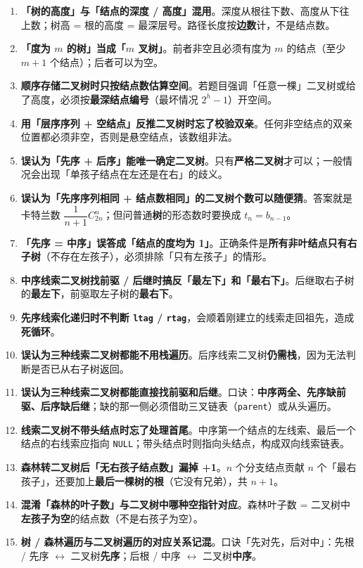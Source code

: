 \documentclass[11pt,openany,UTF8]{ctexbook}
\begin{document}
\begin{enumerate}
\item \textbf{「树的高度」与「结点的深度 / 高度」混用}。深度从根往下数、高度从下往上数；树高 = 根的高度 = 最深层号。路径长度按\textbf{边数}计，不是结点数。
\item \textbf{「度为 $m$ 的树」当成「$m$ 叉树」}。前者非空且必须有度为 $m$ 的结点（至少 $m+1$ 个结点）；后者可以为空。
\item \textbf{顺序存储二叉树时只按结点数估算空间}。若题目强调「任意一棵」二叉树或给了高度，必须按\textbf{最深结点编号}（最坏情况 $2^h-1$）开空间。
\item \textbf{用「层序序列 + 空结点」反推二叉树时忘了校验双亲}。任何非空结点的双亲位置都必须非空，否则是悬空结点，该数组非法。
\item \textbf{误认为「先序 + 后序」能唯一确定二叉树}。只有\textbf{严格二叉树}才可以；一般情况会出现「单孩子结点在左还是在右」的歧义。
\item \textbf{误认为「先序序列相同 + 结点数相同」的二叉树个数可以随便猜}。答案就是卡特兰数 $\dfrac{1}{n+1}C_{2n}^{n}$；但问普通\textbf{树}的形态数时要换成 $t_n=b_{n-1}$。
\item \textbf{「先序 = 中序」误答成「结点的度均为 1」}。正确条件是\textbf{所有非叶结点只有右子树}（不存在左孩子），必须排除「只有左孩子」的情形。
\item \textbf{中序线索二叉树找前驱 / 后继时搞反「最左下」和「最右下」}。后继取右子树的\textbf{最左下}，前驱取左子树的\textbf{最右下}。
\item \textbf{先序线索化递归时不判断 \texttt{ltag} / \texttt{rtag}}，会顺着刚建立的线索走回祖先，造成\textbf{死循环}。
\item \textbf{误认为三种线索二叉树都能不用栈遍历}。后序线索二叉树\textbf{仍需栈}，因为无法判断是否已从右子树返回。
\item \textbf{误认为三种线索二叉树都能直接找前驱和后继}。口诀：\textbf{中序两全、先序缺前驱、后序缺后继}；缺的那一侧必须借助三叉链表（\texttt{parent}）或从头遍历。
\item \textbf{线索二叉树不带头结点时忘了处理首尾}。中序第一个结点的左线索、最后一个结点的右线索应指向 \texttt{NULL}；带头结点时则指向头结点，构成双向线索链表。
\item \textbf{森林转二叉树后「无右孩子结点数」漏掉 +1}。$n$ 个分支结点贡献 $n$ 个「最右孩子」，还要加上\textbf{最后一棵树的根}（它没有兄弟），共 $n+1$。
\item \textbf{混淆「森林的叶子数」与二叉树中哪种空指针对应}。森林叶子数 = 二叉树中\textbf{左孩子为空}的结点数（不是右孩子为空）。
\item \textbf{树 / 森林遍历与二叉树遍历的对应关系记混}。口诀「先对先，后对中」：先根 / 先序 $\leftrightarrow$ 二叉树\textbf{先序}；后根 / 中序 $\leftrightarrow$ 二叉树\textbf{中序}。

\end{enumerate}
\end{document}
